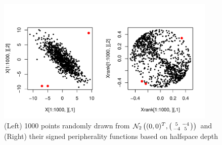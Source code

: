 %
%
% 

\begin{figure}[t]
	\captionsetup{singlelinecheck=off}
	\centering
		\includegraphics[height=6cm]{../Codes/ranks}
	\caption{(Left) 1000 points randomly drawn from $\mathcal N_2\left((0,0)^T, \left(\protect\begin{smallmatrix} 5 & -4 \\ -4 & 5 \protect\end{smallmatrix}\right)\right) $ and (Right) their signed peripherality functions based on halfspace depth}
	\label{fig:rankplot}
\end{figure}

